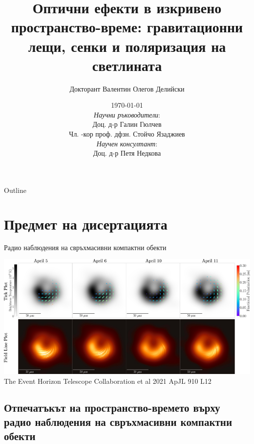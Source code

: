 \documentclass[hyperref={colorlinks,citecolor=blue,linkcolor=blue,urlcolor=blue}]{beamer}
\title[ ]{Оптични ефекти в изкривено пространство-време: гравитационни лещи, сенки и поляризация на светлината}
\author[В. Делийски]{Докторант Валентин Олегов Делийски}
\institute[Теоретична Физика]{Катедра Теоретична Физика, Физически факултет, СУ "св. Климент Охридски"}
\date{\today\newline\\
	  \tiny
	  \emph{Научни ръководители}: \\
	   Доц. д-р Галин Гюлчев\\
	   Чл. -кор проф. дфзн. Стойчо Язаджиев\newline\\
		
	  \emph{Научен консултант}:\\
		
	   Доц. д-р Петя Недкова}
\begin{document}
	
	\begin{frame}
		\titlepage
		\centering
	\end{frame}
	
	\begin{frame}{Outline}
		\tableofcontents
	\end{frame}
	
	\section{Предмет на дисертацията}
	
	\begin{frame}{Радио наблюдения на свръхмасивни компактни обекти}
		
		\centering
		\includegraphics[scale = 0.4]{Pre-Defence/EHT_M87_pol.jpg}\\
		
		\tiny The Event Horizon Telescope Collaboration et al 2021 ApJL 910 L12
		
	\end{frame}
	
	\subsection{Отпечатъкът на пространство-времето върху радио наблюдения на свръхмасивни компактни обекти}
	
\end{document}
